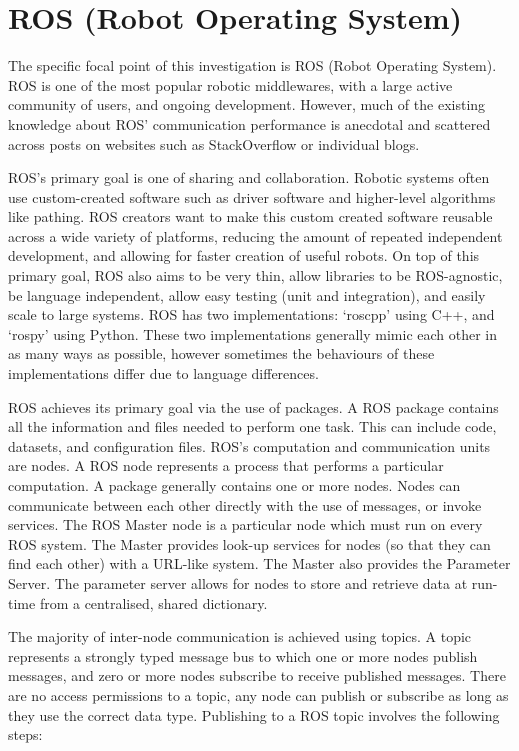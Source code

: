 \documentclass[../dissertation.tex]{subfiles}
\begin{document}
\section{ROS (Robot Operating System)}
\label{background-ros}

The specific focal point of this investigation is ROS (Robot Operating System). ROS is one of the most popular robotic middlewares, with a large active community of users, and ongoing development. However, much of the existing knowledge about ROS' communication performance is anecdotal and scattered across posts on websites such as StackOverflow or individual blogs.

ROS's primary goal is one of sharing and collaboration. Robotic systems often use custom-created software such as driver software and higher-level algorithms like pathing. ROS creators want to make this custom created software reusable across a wide variety of platforms, reducing the amount of repeated independent development, and allowing for faster creation of useful robots. On top of this primary goal, ROS also aims to be very thin, allow libraries to be ROS-agnostic, be language independent, allow easy testing (unit and integration), and easily scale to large systems. ROS has two implementations: `roscpp' using C++, and `rospy' using Python. These two implementations generally mimic each other in as many ways as possible, however sometimes the behaviours of these implementations differ due to language differences.

ROS achieves its primary goal via the use of packages. A ROS package contains all the information and files needed to perform one task. This can include code, datasets, and configuration files. ROS's computation and communication units are nodes. A ROS node represents a process that performs a particular computation. A package generally contains one or more nodes. Nodes can communicate between each other directly with the use of messages, or invoke services. The ROS Master node is a particular node which must run on every ROS system. The Master provides look-up services for nodes (so that they can find each other) with a URL-like system. The Master also provides the Parameter Server. The parameter server allows for nodes to store and retrieve data at run-time from a centralised, shared dictionary.

The majority of inter-node communication is achieved using topics. A topic represents a strongly typed message bus to which one or more nodes publish messages, and zero or more nodes subscribe to receive published messages. There are no access permissions to a topic, any node can publish or subscribe as long as they use the correct data type. Publishing to a ROS topic involves the following steps:
\end{document}
